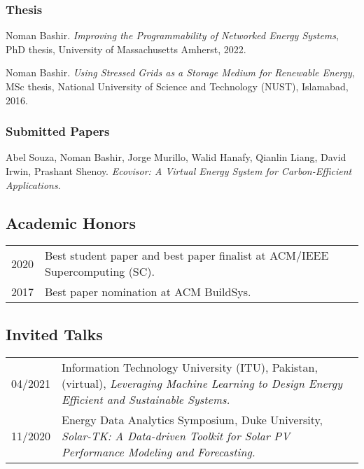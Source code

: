 \documentclass[11pt, a4paper, DIV=12]{scrartcl}
\begin{document}
\begin{thebibliography}{5}
\subsubsection*{Thesis}

Noman Bashir.
\emph{Improving the Programmability of Networked Energy Systems}, PhD thesis, University of Massachusetts Amherst, 2022.

Noman Bashir.
\emph{Using Stressed Grids as a Storage Medium for Renewable Energy}, MSc thesis, National University of Science and Technology (NUST), Islamabad, 2016.


	
\subsubsection*{Submitted Papers}

Abel Souza, Noman Bashir, Jorge Murillo, Walid Hanafy, Qianlin Liang, David Irwin, Prashant Shenoy.
\emph{Ecovisor: A Virtual Energy System for Carbon-Efficient Applications}.
	
\end{thebibliography}

\subsection*{Academic Honors}
\begin{tabular}{p{2.1cm}p{12.0cm}}
	2020& Best student paper and best paper finalist at ACM/IEEE Supercomputing (SC).\\
	2017& Best paper nomination at ACM BuildSys.\\
\end{tabular}

\subsection*{Invited Talks}
\begin{tabular}{p{2.1cm}p{12.0cm}}
04/2021& Information Technology University (ITU), Pakistan, (virtual), \emph{Leveraging Machine Learning to Design Energy Efficient and Sustainable Systems.}\\
11/2020&Energy Data Analytics Symposium, Duke University, \emph{Solar-TK: A Data-driven Toolkit for Solar PV Performance Modeling and Forecasting.}\\
\end{tabular}


\end{document}
